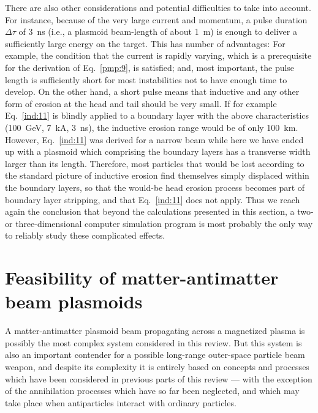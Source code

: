 \documentclass [12pt,a4paper,     ]{report} %
\begin{document}
   There are also other considerations and potential difficulties to take into account.  For instance, because of the very large current and momentum, a pulse duration $\Delta \tau$  of 3~ns (i.e., a plasmoid beam-length of about 1~m) is enough to deliver a sufficiently large energy on the target. This has number of advantages: For example, the condition that the current is rapidly varying, which is a prerequisite for the derivation of Eq.~\eqref{pmp:9}, is satisfied; and, most important, the pulse length is sufficiently short for most instabilities not to have enough time to develop.  On the other hand, a short pulse means that inductive and any other form of erosion at the head and tail should be very small.  If for example Eq.~\eqref{ind:11} is blindly applied to a boundary layer with the above characteristics (100~GeV, 7~kA, 3~ns), the inductive erosion range would be of only 100~km.  However, Eq.~\eqref{ind:11} was derived for a narrow beam while here we have ended up with a plasmoid which comprising the boundary layers has a transverse width larger than its length.  Therefore, most particles that would be lost according to the standard picture of inductive erosion find themselves simply displaced within the boundary layers, so that the would-be head erosion process becomes part of boundary layer stripping, and that Eq.~\eqref{ind:11} does not apply.  Thus we reach again the conclusion that beyond the calculations presented in this section, a two- or three-dimensional computer simulation program is most probably the only way to reliably study these complicated effects.




\section{Feasibility of matter-antimatter beam plasmoids}
\label{epp:0}


A matter-antimatter plasmoid beam propagating across a magnetized plasma is possibly the most complex system considered in this review.  But this system is also an important contender for a possible long-range outer-space particle beam weapon, and despite its complexity it is entirely based on concepts and processes which have been considered in previous parts of this review --- with the exception of the annihilation processes which have so far been neglected, and which may take place when antiparticles interact with ordinary particles.
\end{document}

